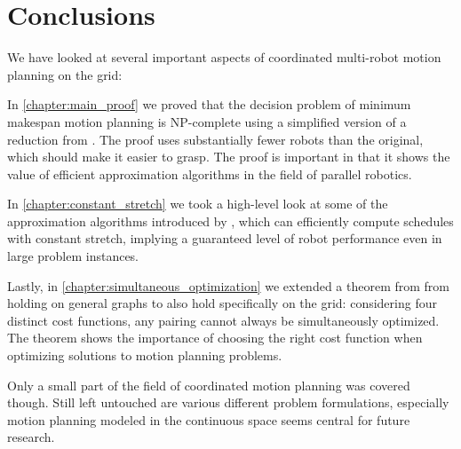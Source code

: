 
\section{Conclusions}

We have looked at several important aspects of coordinated multi-robot motion planning on the grid:

In \cref{chapter:main_proof} we proved that the decision problem of minimum makespan motion planning is NP-complete using a simplified version of a reduction from \cite{siamcomp/DemaineFKMS19}. 
The proof uses substantially fewer robots than the original, which should make it easier to grasp. 
The proof is important in that it shows the value of efficient approximation algorithms in the field of parallel robotics. 

In \cref{chapter:constant_stretch} we took a high-level look at some of the approximation algorithms introduced by \cite{siamcomp/DemaineFKMS19}, which can efficiently compute schedules with constant stretch, implying a guaranteed level of robot performance even in large problem instances.

Lastly, in \cref{chapter:simultaneous_optimization} we extended a theorem from \cite{corr/YuL15c} from holding on general graphs to also hold specifically on the grid: considering four distinct cost functions, any pairing cannot always be simultaneously optimized.
The theorem shows the importance of choosing the right cost function when optimizing solutions to motion planning problems. 

Only a small part of the field of coordinated motion planning was covered though. 
Still left untouched are various different problem formulations, especially motion planning modeled in the continuous space seems central for future research.
